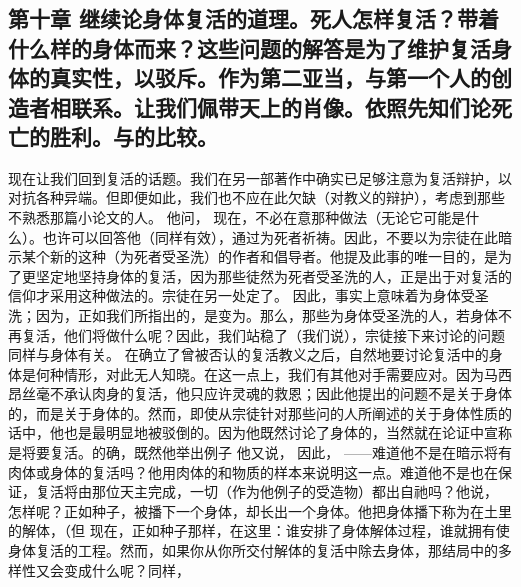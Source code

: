 \subsection{第十章 继续论身体复活的道理。死人怎样复活？带着什么样的身体而来？这些问题的解答是为了维护复活身体的真实性，以驳斥。作为第二亚当，与第一个人的创造者相联系。让我们佩带天上的肖像。依照先知们论死亡的胜利。与的比较。}

现在让我们回到复活的话题。我们在另一部著作中确实已足够注意为复活辩护，以对抗各种异端。但即便如此，我们也不应在此欠缺（对教义的辩护），考虑到那些不熟悉那篇小论文的人。 他问，  现在，不必在意那种做法（无论它可能是什么）。也许可以回答他（同样有效），通过为死者祈祷。因此，不要以为宗徒在此暗示某个新的这种（为死者受圣洗）的作者和倡导者。他提及此事的唯一目的，是为了更坚定地坚持身体的复活，因为那些徒然为死者受圣洗的人，正是出于对复活的信仰才采用这种做法的。宗徒在另一处定了。 因此，事实上意味着为身体受圣洗；因为，正如我们所指出的，是变为。那么，那些为身体受圣洗的人，若身体不再复活，他们将做什么呢？因此，我们站稳了（我们说），宗徒接下来讨论的问题同样与身体有关。  在确立了曾被否认的复活教义之后，自然地要讨论复活中的身体是何种情形，对此无人知晓。在这一点上，我们有其他对手需要应对。因为马西昂丝毫不承认肉身的复活，他只应许灵魂的救恩；因此他提出的问题不是关于身体的，而是关于身体的。然而，即使从宗徒针对那些问的人所阐述的关于身体性质的话中，他也是最明显地被驳倒的。因为他既然讨论了身体的，当然就在论证中宣称是将要复活。的确，既然他举出例子  他又说，  因此，  ——难道他不是在暗示将有肉体或身体的复活吗？他用肉体的和物质的样本来说明这一点。难道他不是也在保证，复活将由那位天主完成，一切（作为他例子的受造物）都出自祂吗？他说，  怎样呢？正如种子，被播下一个身体，却长出一个身体。他把身体播下称为在土里的解体，（但  现在，正如种子那样，在这里：谁安排了身体解体过程，谁就拥有使身体复活的工程。然而，如果你从你所交付解体的复活中除去身体，那结局中的多样性又会变成什么呢？同样，  
